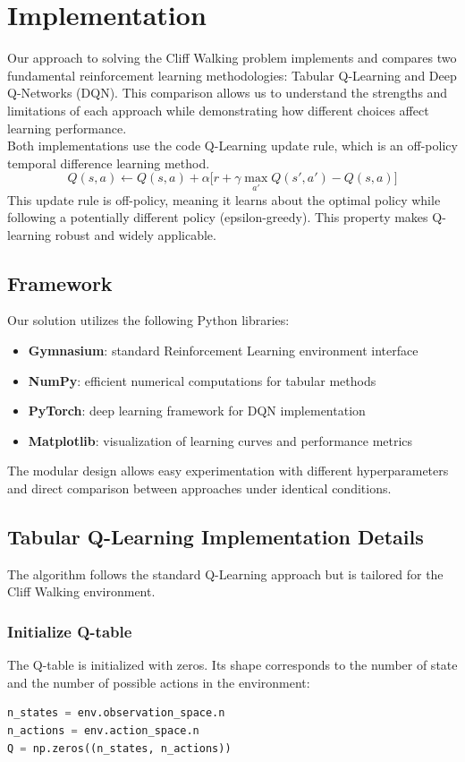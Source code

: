 \documentclass[a4paper,12pt]{article}
\begin{document}
\section{Implementation}
Our approach to solving the Cliff Walking problem implements and compares two fundamental reinforcement learning methodologies: Tabular Q-Learning and Deep Q-Networks (DQN). This comparison allows us to understand the strengths and limitations of each approach while demonstrating how different choices affect learning performance.
\vspace{0,5cm}\\
Both implementations use the code Q-Learning update rule, which is an off-policy temporal difference learning method.
$$Q(s,a) \leftarrow Q(s,a) + \alpha \big[r + \gamma \max_{a'} Q(s',a') - Q(s,a)\big]$$
This update rule is off-policy, meaning it learns about the optimal policy while following a potentially different policy (epsilon-greedy). This property makes Q-learning robust and widely applicable.
\subsection{Framework}
Our solution utilizes the following Python libraries:
\begin{itemize}
    \item \textbf{Gymnasium}: standard Reinforcement Learning environment interface
    \item \textbf{NumPy}: efficient numerical computations for tabular methods
    \item \textbf{PyTorch}: deep learning framework for DQN implementation
    \item \textbf{Matplotlib}: visualization of learning curves and performance metrics
\end{itemize}
The modular design allows easy experimentation with different hyperparameters and direct comparison between approaches under identical conditions.
\subsection{Tabular Q-Learning Implementation Details}
The algorithm follows the standard Q-Learning approach but is tailored for the Cliff Walking environment.
\subsubsection{Initialize Q-table}
The Q-table is initialized with zeros. Its shape corresponds to the number of state and the number of possible actions in the environment:
\begin{lstlisting}[language=Python]
n_states = env.observation_space.n
n_actions = env.action_space.n
Q = np.zeros((n_states, n_actions))
\end{lstlisting}
\end{document}
